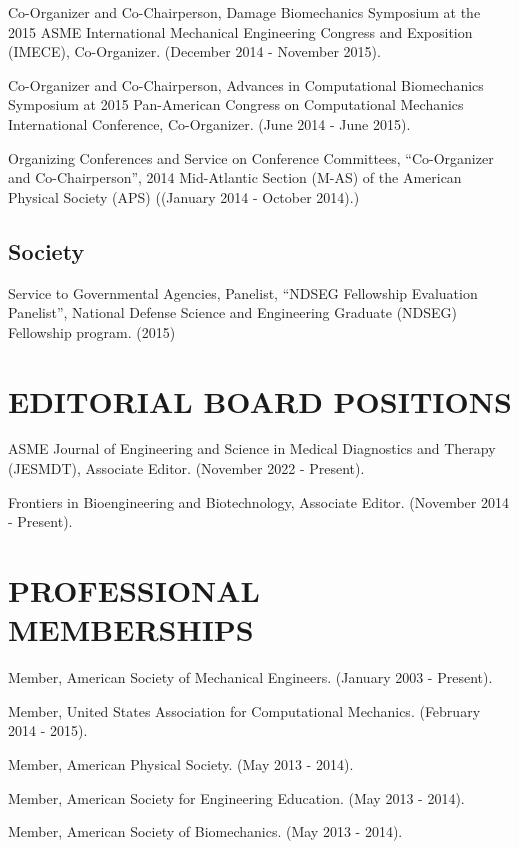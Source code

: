 \documentclass[a4paper,10pt]{article}
\begin{document}
        \noindent Co-Organizer and Co-Chairperson, Damage Biomechanics Symposium at the 2015 ASME International Mechanical Engineering Congress and Exposition (IMECE), Co-Organizer. (December 2014 - November 2015). \vspace{0.25cm}
        
        \noindent Co-Organizer and Co-Chairperson, Advances in Computational Biomechanics Symposium at 2015 Pan-American Congress on Computational Mechanics International Conference, Co-Organizer. (June 2014 - June 2015). \vspace{0.25cm}
        
        \noindent Organizing Conferences and Service on Conference Committees, ``Co-Organizer and Co-Chairperson'', 2014 Mid-Atlantic Section (M-AS) of the American Physical Society (APS) ((January 2014 - October 2014).)\vspace{0.25cm}
        
    \subsection*{Society}
    
        \noindent Service to Governmental Agencies, Panelist, ``NDSEG Fellowship Evaluation Panelist'', National Defense Science and Engineering Graduate (NDSEG) Fellowship program. (2015)\vspace{0.25cm}
        

    \section*{EDITORIAL BOARD POSITIONS}
    
        \noindent ASME Journal of Engineering and Science in Medical Diagnostics and Therapy (JESMDT), Associate Editor. (November 2022 - Present).\vspace{0.25cm}
        
        \noindent Frontiers in Bioengineering and Biotechnology, Associate Editor. (November 2014 - Present).\vspace{0.25cm}
        

    \section*{PROFESSIONAL MEMBERSHIPS}
    
        \noindent Member, American Society of Mechanical Engineers. (January 2003 - Present).\vspace{0.25cm}
        
        \noindent Member, United States Association for Computational Mechanics. (February 2014 - 2015).\vspace{0.25cm}
        
        \noindent Member, American Physical Society. (May 2013 - 2014).\vspace{0.25cm}
        
        \noindent Member, American Society for Engineering Education. (May 2013 - 2014).\vspace{0.25cm}
        
        \noindent Member, American Society of Biomechanics. (May 2013 - 2014).\vspace{0.25cm}
        
\end{document}
